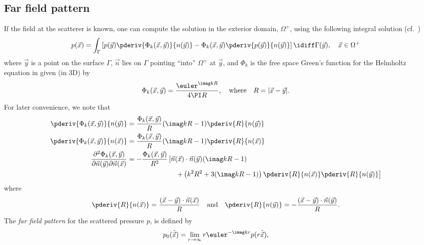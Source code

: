 \subsection{Far field pattern}
If the field at the scatterer is known, one can compute the solution in the exterior domain, $\Omega^+$, using the following integral solution (cf.~\cite[Theorem 2.21]{Chandler_Wilde2012nab})
\begin{equation}\label{Eq3:KirchhoffIntegral}
	p(\vec{x}) = \int_{\Gamma}\left[ p(\vec{y})\pderiv{\Phi_k(\vec{x},\vec{y})}{n(\vec{y})} - \Phi_k(\vec{x},\vec{y})\pderiv{p(\vec{y})}{n(\vec{y})}\right]\idiff \Gamma(\vec{y}),\quad\vec{x}\in\Omega^+
\end{equation}
where $\vec{y}$ is a point on the surface $\Gamma$, $\vec{n}$ lies on $\Gamma$ pointing ``into'' $\Omega^+$ at $\vec{y}$, and $\Phi_k$ is the free space Green's function for the Helmholtz equation in  given (in 3D) by
\begin{equation}\label{Eq3:FreeSpaceGrensFunction}
	\Phi_k(\vec{x},\vec{y}) = \frac{\euler^{\imag kR}}{4\PI R},\quad\text{where}\quad R = |\vec{x} - \vec{y}|.
\end{equation} 
For later convenience, we note that
\begin{align*}
	\pderiv{\Phi_k(\vec{x},\vec{y})}{n(\vec{y})} &= \frac{\Phi_k(\vec{x},\vec{y})}{R}(\imag kR-1)\pderiv{R}{n(\vec{y})}\\
	\pderiv{\Phi_k(\vec{x},\vec{y})}{n(\vec{x})} &= \frac{\Phi_k(\vec{x},\vec{y})}{R}(\imag kR-1)\pderiv{R}{n(\vec{x})}\\
	\frac{\partial^2\Phi_k(\vec{x},\vec{y})}{\partial\vec{n}(\vec{y})\partial\vec{n}(\vec{x})} &= -\frac{\Phi_k(\vec{x},\vec{y})}{R^2}\left[\vec{n}(\vec{x})\cdot\vec{n}(\vec{y})(\imag kR-1) \phantom{\pderiv{R}{n(\vec{y})}}\right.\\
	&{\hskip7em\relax}\left. +\left(k^2R^2+3(\imag kR - 1)\right)\pderiv{R}{n(\vec{x})}\pderiv{R}{n(\vec{y})}\right]
\end{align*}
where
\begin{equation*}
	\pderiv{R}{n(\vec{x})} = \frac{(\vec{x}-\vec{y})\cdot\vec{n}(\vec{x})}{R}\quad\text{and}\quad\pderiv{R}{n(\vec{y})} = -\frac{(\vec{x}-\vec{y})\cdot\vec{n}(\vec{y})}{R}.
\end{equation*}
The \textit{far field pattern} for the scattered pressure $p$, is defined by
\begin{equation}\label{Eq3:farfield}
	p_0(\hat{\vec{x}}) =  \lim_{r\to\infty} r \euler^{-\imag k r}p(r\hat{\vec{x}}),
\end{equation}
